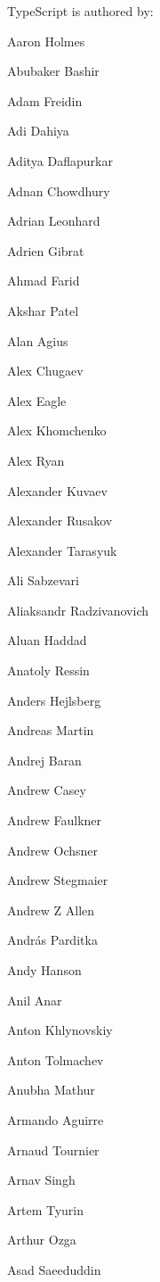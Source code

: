 Type\+Script is authored by\+:
\begin{DoxyItemize}
\item Aaron Holmes
\item Abubaker Bashir
\item Adam Freidin
\item Adi Dahiya
\item Aditya Daflapurkar
\item Adnan Chowdhury
\item Adrian Leonhard
\item Adrien Gibrat
\item Ahmad Farid
\item Akshar Patel
\item Alan Agius
\item Alex Chugaev
\item Alex Eagle
\item Alex Khomchenko
\item Alex Ryan
\item Alexander Kuvaev
\item Alexander Rusakov
\item Alexander Tarasyuk
\item Ali Sabzevari
\item Aliaksandr Radzivanovich
\item Aluan Haddad
\item Anatoly Ressin
\item Anders Hejlsberg
\item Andreas Martin
\item Andrej Baran
\item Andrew Casey
\item Andrew Faulkner
\item Andrew Ochsner
\item Andrew Stegmaier
\item Andrew Z Allen
\item András Parditka
\item Andy Hanson
\item Anil Anar
\item Anton Khlynovskiy
\item Anton Tolmachev
\item Anubha Mathur
\item Armando Aguirre
\item Arnaud Tournier
\item Arnav Singh
\item Artem Tyurin
\item Arthur Ozga
\item Asad Saeeduddin

\end{DoxyItemize}
